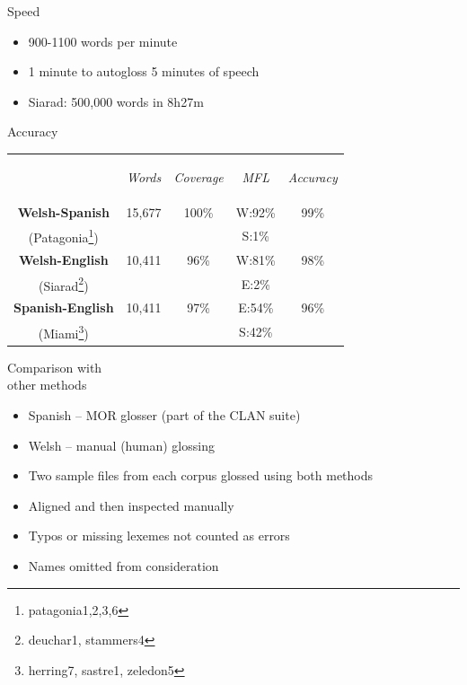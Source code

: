 \documentclass[hyperref={pdfpagelabels=false}, 14pt]{beamer}
\begin{document}
\begin{frame}{Speed}
\begin{itemize}
\item 900-1100 words per minute
\item 1 minute to autogloss 5 minutes of speech
\item Siarad: 500,000 words in 8h27m
% 
\end{itemize}
\end{frame}


\begin{frame}{Accuracy}
\begin{center}
\begin{tabular}{ccccc}
& \begin{small}\textit{Words}\end{small} & \begin{small}\textit{Coverage}\end{small} & \begin{small}\textit{MFL}\end{small} & \begin{small}\textit{Accuracy}\end{small} \\
\cline{1-5}\noalign{\smallskip}
\textbf{Welsh-Spanish} & 15,677 & 100\% & W:92\% & 99\% \\
(Patagonia\footnote{patagonia1,2,3,6}) & & & S:1\% \\
\textbf{Welsh-English} & 10,411 & 96\% & W:81\% & 98\% \\
(Siarad\footnote{deuchar1, stammers4}) & & & E:2\% \\
\textbf{Spanish-English} & 10,411 & 97\% & E:54\% & 96\% \\
(Miami\footnote{herring7, sastre1, zeledon5}) & & & S:42\% \\
\end{tabular}
\end{center}
\end{frame}


\begin{frame}{Comparison with \\ other methods}
\begin{itemize}
\item Spanish -- MOR glosser (part of the CLAN suite)
\item Welsh -- manual (human) glossing
\item Two sample files from each corpus glossed using both methods
\item Aligned and then inspected manually
\item Typos or missing lexemes not counted as errors
\item Names omitted from consideration
\end{itemize}
\end{frame}
\end{document}
